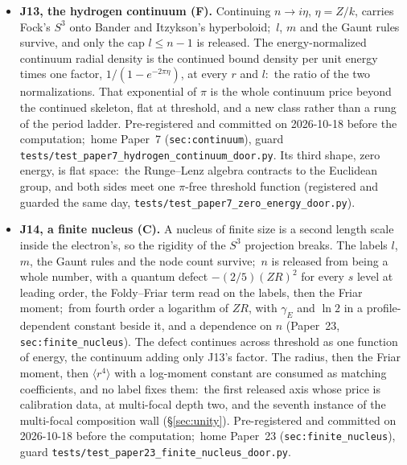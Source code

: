 \documentclass[11pt,a4paper]{article}
\theoremstyle{plain}
\theoremstyle{definition}
\begin{document}
\begin{itemize}
  \item \textbf{J13, the hydrogen continuum (F).} Continuing $n \to i\eta$, $\eta = Z/k$, carries Fock's $S^3$ onto Bander and Itzykson's hyperboloid;\ $l$, $m$ and the Gaunt rules survive, and only the cap $l \le n-1$ is released. The energy-normalized continuum radial density is the continued bound density per unit energy times one factor, $1/(1-e^{-2\pi\eta})$, at every $r$ and $l$:\ the ratio of the two normalizations. That exponential of $\pi$ is the whole continuum price beyond the continued skeleton, flat at threshold, and a new class rather than a rung of the period ladder. Pre-registered and committed on 2026-10-18 before the computation;\ home Paper~7 (\texttt{sec:continuum}), guard \texttt{tests/test\_paper7\_hydrogen\_continuum\_door.py}. Its third shape, zero energy, is flat space:\ the Runge--Lenz algebra contracts to the Euclidean group, and both sides meet one $\pi$-free threshold function (registered and guarded the same day, \texttt{tests/test\_paper7\_zero\_energy\_door.py}).
  \item \textbf{J14, a finite nucleus (C).} A nucleus of finite size is a second length scale inside the electron's, so the rigidity of the $S^3$ projection breaks. The labels $l$, $m$, the Gaunt rules and the node count survive;\ $n$ is released from being a whole number, with a quantum defect $-(2/5)(ZR)^2$ for every $s$ level at leading order, the Foldy--Friar term read on the labels, then the Friar moment;\ from fourth order a logarithm of $ZR$, with $\gamma_E$ and $\ln 2$ in a profile-dependent constant beside it, and a dependence on $n$ (Paper~23, \texttt{sec:finite\_nucleus}). The defect continues across threshold as one function of energy, the continuum adding only J13's factor. The radius, then the Friar moment, then $\langle r^4\rangle$ with a log-moment constant are consumed as matching coefficients, and no label fixes them:\ the first released axis whose price is calibration data, at multi-focal depth two, and the seventh instance of the multi-focal composition wall (\S\ref{sec:unity}). Pre-registered and committed on 2026-10-18 before the computation;\ home Paper~23 (\texttt{sec:finite\_nucleus}), guard \texttt{tests/test\_paper23\_finite\_nucleus\_door.py}.

\end{itemize}
\end{document}
